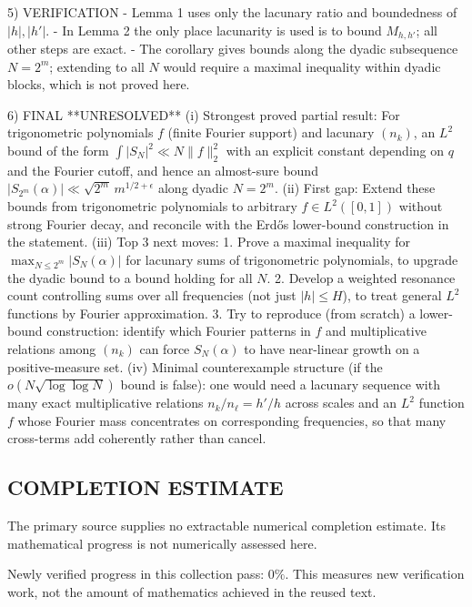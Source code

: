 5) VERIFICATION
- Lemma 1 uses only the lacunary ratio and boundedness of $|h|,|h'|$.
- In Lemma 2 the only place lacunarity is used is to bound $M_{h,h'}$; all other steps are exact.
- The corollary gives bounds along the dyadic subsequence $N=2^m$; extending to all $N$ would require a maximal inequality within dyadic blocks, which is not proved here.

6) FINAL
**UNRESOLVED**
(i) Strongest proved partial result: For trigonometric polynomials $f$ (finite Fourier support) and lacunary $(n_k)$, an $L^2$ bound of the form $\int|S_N|^2\ll N\|f\|_2^2$ with an explicit constant depending on $q$ and the Fourier cutoff, and hence an almost-sure bound $|S_{2^m}(\alpha)|\ll \sqrt{2^m}\,m^{1/2+\epsilon}$ along dyadic $N=2^m$.
(ii) First gap: Extend these bounds from trigonometric polynomials to arbitrary $f\in L^2([0,1])$ without strong Fourier decay, and reconcile with the Erd\H{o}s lower-bound construction in the statement.
(iii) Top 3 next moves:
  1. Prove a maximal inequality for $\max_{N\le 2^m}|S_N(\alpha)|$ for lacunary sums of trigonometric polynomials, to upgrade the dyadic bound to a bound holding for all $N$.
  2. Develop a weighted resonance count controlling sums over all frequencies (not just $|h|\le H$), to treat general $L^2$ functions by Fourier approximation.
  3. Try to reproduce (from scratch) a lower-bound construction: identify which Fourier patterns in $f$ and multiplicative relations among $(n_k)$ can force $S_N(\alpha)$ to have near-linear growth on a positive-measure set.
(iv) Minimal counterexample structure (if the $o(N\sqrt{\log\log N})$ bound is false): one would need a lacunary sequence with many exact multiplicative relations $n_k/n_\ell=h'/h$ across scales and an $L^2$ function $f$ whose Fourier mass concentrates on corresponding frequencies, so that many cross-terms add coherently rather than cancel.




\subsection*{COMPLETION ESTIMATE}
The primary source supplies no extractable numerical completion estimate. Its mathematical progress is not numerically assessed here.

Newly verified progress in this collection pass: $0\%$. This measures new verification work, not the amount of mathematics achieved in the reused text.

